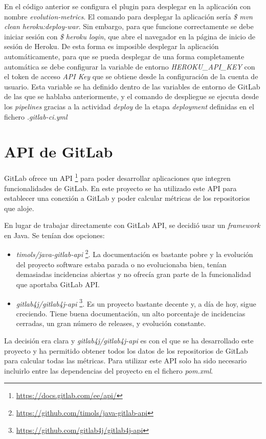 En el código anterior se configura el plugin para desplegar en la aplicación con nombre \textit{evolution-metrics}. El comando para  desplegar la aplicación sería \textit{\$ mvn clean heroku:deploy-war}. Sin embargo, para que funcione correctamente se debe iniciar sesión con \textit{\$ heroku login}, que abre el navegador en la página de inicio de sesión de Heroku. De esta forma es imposible desplegar la aplicación automáticamente, para que se pueda desplegar de una forma completamente automática se debe configurar la variable de entorno \textit{HEROKU\_API\_KEY} con el token de acceso \textit{API Key} que se obtiene desde la configuración de la cuenta de usuario. Esta variable se ha definido dentro de las variables de entorno de GitLab de las que se hablaba anteriormente, y el comando de despliegue se ejecuta desde los \textit{pipelines} gracias a la actividad \textit{deploy} de la etapa \textit{deployment} definidas en el fichero \textit{.gitlab-ci.yml}
\section{API de GitLab}

GitLab ofrece un API \footnote{\url{https://docs.gitlab.com/ee/api/}} para poder desarrollar aplicaciones que integren funcionalidades de GitLab. En este proyecto se ha utilizado este API para establecer una conexión a GitLab y poder calcular métricas de los repositorios que aloje.

En lugar de trabajar directamente con GitLab API, se decidió usar un \textit{framework} en Java. Se tenían dos opciones:
\begin{itemize}
	\item \textit{timols/java-gitlab-api} \footnote{\url{https://github.com/timols/java-gitlab-api}}. La documentación es bastante pobre y la evolución del proyecto software estaba parada o no evolucionaba bien, tenían demasiadas incidencias abiertas y no ofrecía gran parte de la funcionalidad que aportaba GitLab API.
	\item  \textit{gitlab4j/gitlab4j-api} \footnote{\url{https://github.com/gitlab4j/gitlab4j-api}}. Es un proyecto bastante decente y, a día de hoy, sigue creciendo. Tiene buena documentación,  un alto porcentaje de incidencias cerradas, un gran número de releases, y evolución constante. 
\end{itemize}

La decisión era clara y \textit{gitlab4j/gitlab4j-api} es con el que se ha desarrollado este proyecto y ha permitido obtener todos los datos de los repositorios de GitLab para calcular todas las métricas. Para utilizar este API solo ha sido necesario incluirlo entre las dependencias del proyecto en el fichero \textit{pom.xml}. 

